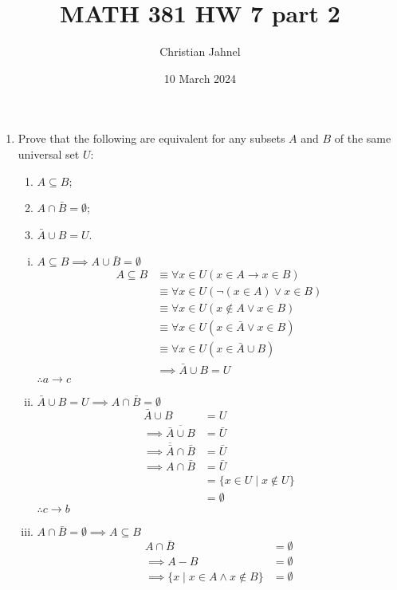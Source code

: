 \documentclass[letterpaper, 12pt]{article}
\title{MATH 381 HW 7 part 2}
\author{Christian Jahnel}
\date{10 March 2024}
\newcommand{\then}{\rightarrow}
\newcommand{\0}{\emptyset}
\begin{document}
\maketitle
\begin{enumerate}
\item Prove that the following are equivalent for any subsets $A$ and $B$ of the same universal 
set $U$:
\begin{enumerate}
\item $A \subseteq B$;
\item $A \cap \bar{B} = \0$;
\item $\bar{A} \cup B = U$.
\end{enumerate}
\begin{enumerate}[i.]
    \item $A \subseteq B \implies A \cup \bar{B} = \0$
    \begin{align*}
        A \subseteq B &\equiv \forall x \in U(x \in A \then x \in B) \\
        &\equiv \forall x \in U(\neg(x \in A) \vee x \in B) \\
        &\equiv \forall x \in U(x \notin A \vee x \in B) \\
        &\equiv \forall x \in U(x \in \bar{A} \vee x \in B) \\
        &\equiv \forall x \in U(x \in \bar{A} \cup B) \\
        &\implies \bar{A} \cup B = U
    \end{align*}
    $\therefore a \then c$
    \item $\bar{A} \cup B = U \implies A \cap \bar{B} = \0$
    \begin{align*}
        \bar{A} \cup B &= U \\
        \implies \overline{\bar{A} \cup B} &= \bar{U} \\
        \implies \overline{\bar{A}} \cap \bar{B} &= \bar{U} \\
        \implies A \cap \bar{B} &= \bar{U} \\
        &= \{x \in U \mid x \notin U\} \\
        &= \0
    \end{align*}
    $\therefore c \then b$
    \item $A \cap \bar{B} = \0 \implies A \subseteq B$
    \begin{align*}
        A \cap \bar{B} &= \0 \\
        \implies A - B &= \0 \\
        \implies \{x \mid x \in A \wedge x \notin B\} &= \0
    \end{align*}

\end{enumerate}
\end{enumerate}
\end{document}
